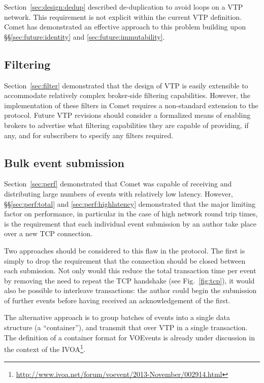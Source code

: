 \documentclass[5p,authoryear]{elsarticle}
\begin{document}
Section~\ref{sec:design:dedup} described de-duplication to avoid loops on a
VTP network. This requirement is not explicit within the current VTP
definition. Comet has demonstrated an effective approach to this problem
building upon \S\S\ref{sec:future:identity} and \ref{sec:future:immutability}.

\subsection{Filtering}
\label{sec:future:filter}

Section~\ref{sec:filter} demonstrated that the design of VTP is easily
extensible to accommodate relatively complex broker-side filtering
capabilities. However, the implementation of these filters in Comet requires a
non-standard extension to the protocol. Future VTP revisions should consider a
formalized means of enabling brokers to advertise what filtering capabilities
they are capable of providing, if any, and for subscribers to specify any
filters required.

\subsection{Bulk event submission}
\label{sec:future:bulk}

Section~\ref{sec:perf} demonstrated that Comet was capable of receiving and
distributing large numbers of events with relatively low latency. However,
\S\S\ref{sec:perf:total} and \ref{sec:perf:highlatency} demonstrated that
the major limiting factor on performance, in particular in the case of high
network round trip times, is the requirement that each individual event
submission by an author take place over a new TCP connection.

Two approaches should be considered to this flaw in the protocol. The first is
simply to drop the requirement that the connection should be closed between
each submission. Not only would this reduce the total transaction time per
event by removing the need to repeat the TCP handshake (see
Fig.~\ref{fig:tcp}), it would also be possible to interleave transactions: the
author could begin the submission of further events before having received an
acknowledgement of the first.

The alternative approach is to group batches of events into a single data
structure (a ``container''), and transmit that over VTP in a single
transaction. The definition of a container format for VOEvents is already
under discussion in the context of the
IVOA\footnote{\url{http://www.ivoa.net/forum/voevent/2013-November/002914.html}}.
\end{document}
